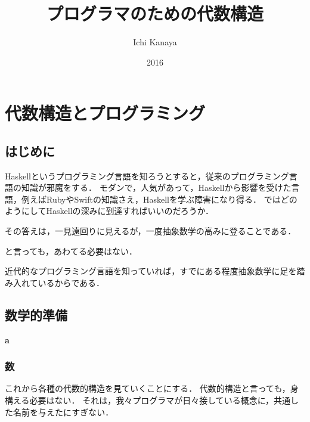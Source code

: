 \documentclass[twocolumn]{jsbook}
\title{プログラマのための代数構造}
\author{Ichi Kanaya}
\date{2016}
\newenvironment{leader}{\begingroup\bf}{\endgroup}
\begin{document}
\maketitle
\tableofcontents

\part{代数構造とプログラミング}

\chapter{はじめに}

Haskellというプログラミング言語を知ろうとすると，従来のプログラミング言語の知識が邪魔をする．
モダンで，人気があって，Haskellから影響を受けた言語，例えばRubyやSwiftの知識さえ，Haskellを学ぶ障害になり得る．
ではどのようにしてHaskellの深みに到達すればいいのだろうか．

その答えは，一見遠回りに見えるが，一度抽象数学の高みに登ることである．

と言っても，あわてる必要はない．

近代的なプログラミング言語を知っていれば，すでにある程度抽象数学に足を踏み入れているからである．

\chapter{数学的準備}

\begin{leader}
a
\end{leader}

\section{数}

これから各種の代数的構造を見ていくことにする．
代数的構造と言っても，身構える必要はない．
それは，我々プログラマが日々接している概念に，共通した名前を与えたにすぎない．
\end{document}
